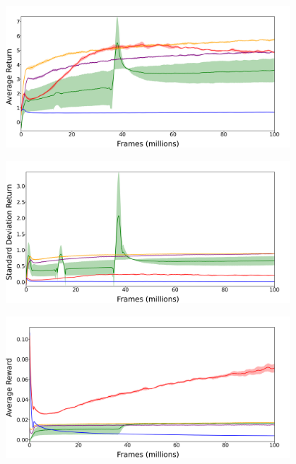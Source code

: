 \documentclass[draft,final]{vutinfth} %
\begin{document}
    \newpage

    \begin{figure}[H]
        \centering
        \includegraphics[width=0.95\textwidth]{figures/freeway/Freeway_retmean.png}
    \end{figure}

    \begin{figure}[H]
        \centering
        \includegraphics[width=0.95\textwidth]{figures/freeway/Freeway_retstd.png}
    \end{figure}


    \newpage

    \begin{figure}[H]
        \centering
        \includegraphics[width=0.95\textwidth]{figures/freeway/Freeway_rew_mean.png}
    \end{figure}
\end{document}

